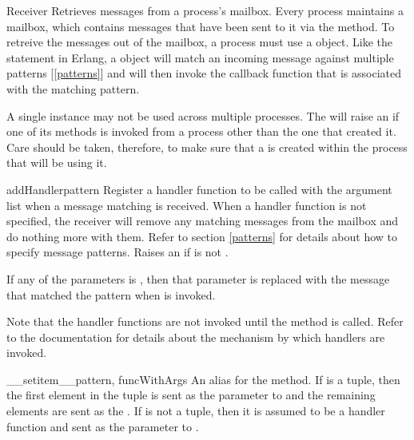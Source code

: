\documentclass{howto}
\begin{document}
\begin{classdesc}{Receiver}{}
Retrieves messages from a process's mailbox. Every process maintains a mailbox,
which contains messages that have been sent to it via the 
method. To retreive the messages out of the mailbox, a process must use a
 object. Like the  statement in Erlang, a
 object will match an incoming message against multiple patterns
[\ref{patterns}] and will then invoke the callback function that is associated
with the matching pattern.

A single  instance may not be used across multiple processes.
The  will raise an  if one of its
methods is invoked from a process other than the one that created it. Care
should be taken, therefore, to make sure that a  is created
within the process that will be using it.

\begin{methoddesc}{addHandler}{pattern}
Register a handler function  to be called with the  argument
list when a message matching  is received. When a handler function
 is not specified, the receiver will remove any matching messages from
the mailbox and do nothing more with them. Refer to section \ref{patterns} for
details about how to specify message patterns. Raises an
 if  is not .

If any of the  parameters is , then that
parameter is replaced with the message that matched the pattern when 
is invoked.

Note that the handler functions are not invoked until the 
method is called. Refer to the  documentation for details
about the mechanism by which handlers are invoked.
\end{methoddesc}

\begin{methoddesc}{__setitem__}{pattern, funcWithArgs}
An alias for the  method. If  is a tuple,
then the first element in the tuple is sent as the  parameter to
 and the remaining elements are sent as the . If
 is not a tuple, then it is assumed to be a handler function
and sent as the  parameter to .


\end{methoddesc}
\end{classdesc}
\end{document}
